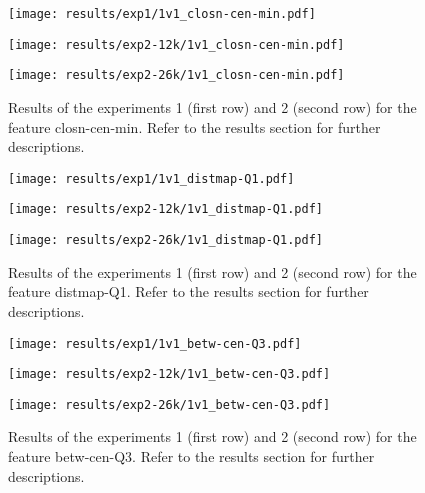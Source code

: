  
\begin{figure}[h!]
    \centering
	\begin{minipage}{0.3\linewidth}
		\texttt{[image: results/exp1/1v1\_closn-cen-min.pdf]}
	\end{minipage}

	\begin{minipage}{0.3\linewidth}
		\texttt{[image: results/exp2-12k/1v1\_closn-cen-min.pdf]}
	\end{minipage}
	\begin{minipage}{0.3\linewidth}
		\texttt{[image: results/exp2-26k/1v1\_closn-cen-min.pdf]}
	\end{minipage}

	\caption[ Results: Feature closn-cen-min]{ Results of the experiments 1 (first row) and 2 (second row) for the feature closn-cen-min. Refer to the results section for further descriptions. }
	\label{fig:appendix_closn-cen-min}
\end{figure}
 
\begin{figure}[h!]
    \centering
	\begin{minipage}{0.3\linewidth}
		\texttt{[image: results/exp1/1v1\_distmap-Q1.pdf]}
	\end{minipage}

	\begin{minipage}{0.3\linewidth}
		\texttt{[image: results/exp2-12k/1v1\_distmap-Q1.pdf]}
	\end{minipage}
	\begin{minipage}{0.3\linewidth}
		\texttt{[image: results/exp2-26k/1v1\_distmap-Q1.pdf]}
	\end{minipage}

	\caption[ Results: Feature distmap-Q1]{ Results of the experiments 1 (first row) and 2 (second row) for the feature distmap-Q1. Refer to the results section for further descriptions. }
	\label{fig:appendix_distmap-Q1}
\end{figure}
 \newpage 

 
\begin{figure}[h!]
    \centering
	\begin{minipage}{0.3\linewidth}
		\texttt{[image: results/exp1/1v1\_betw-cen-Q3.pdf]}
	\end{minipage}

	\begin{minipage}{0.3\linewidth}
		\texttt{[image: results/exp2-12k/1v1\_betw-cen-Q3.pdf]}
	\end{minipage}
	\begin{minipage}{0.3\linewidth}
		\texttt{[image: results/exp2-26k/1v1\_betw-cen-Q3.pdf]}
	\end{minipage}

	\caption[ Results: Feature betw-cen-Q3]{ Results of the experiments 1 (first row) and 2 (second row) for the feature betw-cen-Q3. Refer to the results section for further descriptions. }
	\label{fig:appendix_betw-cen-Q3}
\end{figure}
 
